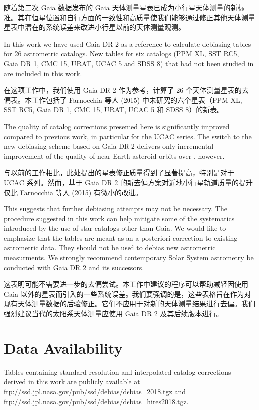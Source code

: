 \documentclass[review]{elsarticle}
\begin{document}
随着第二次 Gaia 数据发布的 Gaia 天体测量星表已成为小行星天体测量的新标准。其在恒星位置和自行方面的一致性和高质量使我们能够通过修正其他天体测量星表中潜在的系统误差来改进小行星以前的天体测量观测。

In this work we have used Gaia DR 2 as a reference to calculate debiasing tables for 26 astrometric catalogs. New tables for six catalogs (PPM XL, SST RC5, Gaia DR 1, CMC 15, URAT, UCAC 5 and SDSS 8) that had not been studied in \citet{farnocchia15} are included in this work.

在这项工作中，我们使用 Gaia DR 2 作为参考，计算了 26 个天体测量星表的去偏表。本工作包括了 Farnocchia 等人 (2015) 中未研究的六个星表（PPM XL, SST RC5, Gaia DR 1, CMC 15, URAT, UCAC 5 和 SDSS 8）的新表。

The quality of catalog corrections presented here is significantly improved compared to previous work, in particular for the UCAC series.  
The switch to the new debiasing scheme based on Gaia DR 2 delivers only incremental improvement of the quality of near-Earth asteroid orbits over \citet{farnocchia15}, however.

与以前的工作相比，此处提出的星表修正质量得到了显著提高，特别是对于 UCAC 系列。然而，基于 Gaia DR 2 的新去偏方案对近地小行星轨道质量的提升仅比 Farnocchia 等人 (2015) 有微小的改进。

This suggests that further debiasing attempts may not be necessary. 
The procedure suggested in this work can help mitigate some of the systematics introduced by the use of star catalogs other than Gaia. We would like to emphasize that 
the tables are meant as an a posteriori correction to existing astrometric data. They should not be used to debias new astrometric measurments.
We strongly recommend contemporary Solar System astrometry be conducted with Gaia DR 2 and its successors. 

这表明可能不需要进一步的去偏尝试。本工作中建议的程序可以帮助减轻因使用 Gaia 以外的星表而引入的一些系统误差。我们要强调的是，这些表格旨在作为对现有天体测量数据的后验修正。它们不应用于对新的天体测量结果进行去偏。我们强烈建议当代的太阳系天体测量应使用 Gaia DR 2 及其后续版本进行。

\section{Data Availability}
Tables containing standard resolution and interpolated catalog corrections derived in this work are publicly available at \url{ftp://ssd.jpl.nasa.gov/pub/ssd/debias/debias_2018.tgz}
and 
\url{ftp://ssd.jpl.nasa.gov/pub/ssd/debias/debias_hires2018.tgz}.
\end{document}
